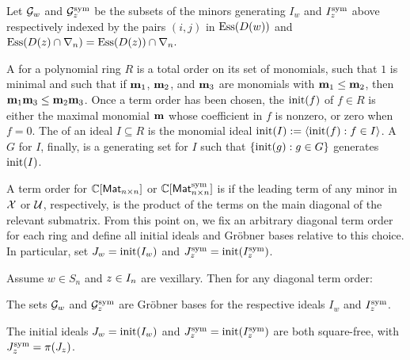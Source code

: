 \documentclass[10pt]{article}
\begin{document}
\begin{definition}
Let $\mathcal{G}_w$ and $\mathcal{G}^{\mathrm{sym}}_z$ be the subsets of the minors generating $I_w$ and $I^{\mathrm{sym}}_z$ above 
respectively indexed by the pairs $(i,j) $ in 
$\operatorname{Ess}(D(w))$ and $ \operatorname{Ess}( D(z)\cap \nabla_n)= \operatorname{Ess}(D(z)) \cap \nabla_n.$
\end{definition}

A    for a polynomial ring $R$ is a total order on its set of    monomials,
such that $1$ is   minimal and such that if $\mathbf{m}_1$, $\mathbf{m}_2$, and $\mathbf{m}_3$ are monomials with $\mathbf{m}_1 \leq \mathbf{m}_2$, 
then $\mathbf{m}_1  \mathbf{m}_3 \leq \mathbf{m}_2 \mathbf{m}_3$. 
Once a term order has been chosen, the    $\mathrm{init}(f)$ of $f \in R$ is either the maximal monomial $\mathbf{m}$ whose coefficient in $f$ is nonzero, or zero when $f=0$.
The  of an ideal $I\subseteq R$ is
the monomial ideal $\mathrm{init}(I) := \langle\mathrm{init}(f) : f \in I\rangle$.
A  $G$ for $I$, finally,
is a generating set for $I$ such that $\{ \mathrm{init}(g) :g \in G\}$ generates $\mathrm{init}(I)$.




A term order for $\mathbb{C}[\mathsf{Mat}_{n\times n}]$ or $\mathbb{C}[\mathsf{Mat}^{\mathrm{sym}}_{n\times n}]$ is
  if the leading term of any minor in $\mathcal{X}$ or $\mathcal{U}$, respectively, is the product of the terms on the main diagonal of the relevant submatrix.
 From this point on, we fix an arbitrary diagonal term order 
 for each ring and define all initial ideals and Gr\"obner bases relative to this choice. In particular, set $J_w = \mathrm{init}(I_w)$ and $J^{\mathrm{sym}}_z = \mathrm{init}(I^{\mathrm{sym}}_z)$.
 
 \begin{theorem} 
 \label{gr-thm1}
 Assume $w \in S_n$ and $z \in I_n$ are vexillary.
Then  for any diagonal term order:
 \ben
 \item[(a)] The sets $\mathcal{G}_w$ and $\mathcal{G}^{\mathrm{sym}}_z$ are Gr\"obner bases for the respective ideals $I_w$ and $I^{\mathrm{sym}}_z$.%
  
 
 \item[(b)] 
 The initial ideals $J_w = \mathrm{init}(I_w)$ and $J^{\mathrm{sym}}_z = \mathrm{init}(I^{\mathrm{sym}}_z)$  are both square-free, with $J^{\mathrm{sym}}_z = \pi(J_z)$.
 \een
 \end{theorem}
 
\end{document}

